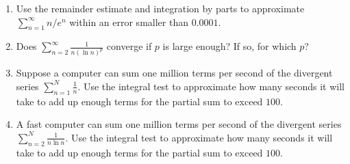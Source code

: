 \documentclass{exercises}
\begin{document}
\begin{enumerate}[resume]
\item \techrequired Use the remainder estimate and integration by parts to approximate $\sum_{n=1}^{\infty}n/e^{n}$ within an error smaller than $0.0001$.
\item Does $\sum_{n=2}^{\infty}\frac{1}{n(\ln n)^{p}}$ converge if $p$ is large enough? If so, for which $p$?
\item \techrequired Suppose a computer can sum one million terms per second of the divergent series $\sum_{n=1}^{N}\frac{1}{n}$. Use the integral test to approximate how many seconds it will take to add up enough terms for the partial sum to exceed $100$.
\item \techrequired A fast computer can sum one million terms per second of the divergent series $\sum_{n=2}^{N}\frac{1}{n\ln n}$. Use the integral test to approximate how many seconds it will take to add up enough terms for the partial sum to exceed $100$.
\end{enumerate}
\end{document}
